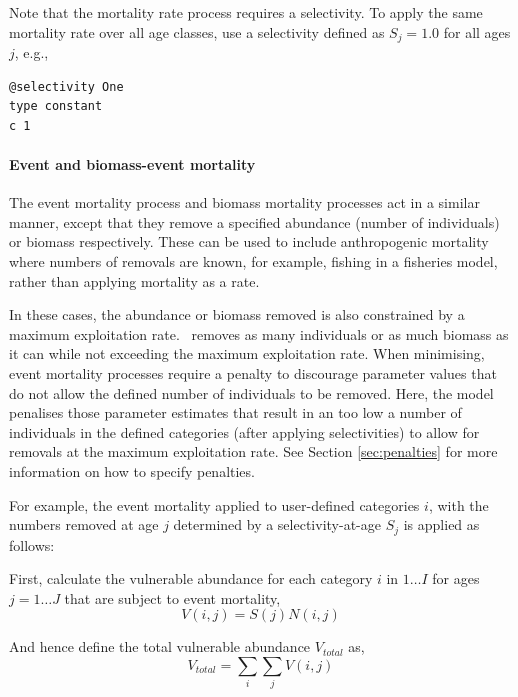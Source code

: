 Note that the mortality rate process requires a selectivity. To apply the same mortality rate over all age classes, use a selectivity defined as $S_j=1.0$ for all ages $j$, e.g.,

{\small{\begin{verbatim}
@selectivity One
type constant
c 1
\end{verbatim}}}

\paragraph{Event and biomass-event mortality}

The event mortality process and biomass mortality processes act in a similar manner, except that they remove a specified abundance (number of individuals) or biomass respectively. These can be used to include anthropogenic mortality where numbers of removals are known, for example, fishing in a fisheries model, rather than applying mortality as a rate. 

In these cases, the abundance or biomass removed is also constrained by a maximum exploitation rate. \CNAME\ removes as many individuals or as much biomass as it can while not exceeding the maximum exploitation rate. When minimising, event mortality processes require a penalty to discourage parameter values that do not allow the defined number of individuals to be removed. Here, the model penalises those parameter estimates that result in an too low a number of individuals in the defined categories (after applying selectivities) to allow for removals at the maximum exploitation rate. See Section \ref{sec:penalties} for more information on how to specify penalties.

For example, the event mortality applied to user-defined categories $i$, with the numbers removed at age $j$ determined by a selectivity-at-age $S_j$ is applied as follows:

First, calculate the vulnerable abundance for each category $i$ in $1 \ldots I$ for ages $j = 1 \ldots J$ that are subject to event mortality,
\begin{equation}
  V(i,j) = S(j) N(i,j)
\end{equation}

And hence define the total vulnerable abundance $V_{total}$ as,
\begin{equation}
  V_{total}  = \sum\limits_i {\sum\limits_j {V(i,j)}} 
\end{equation}

